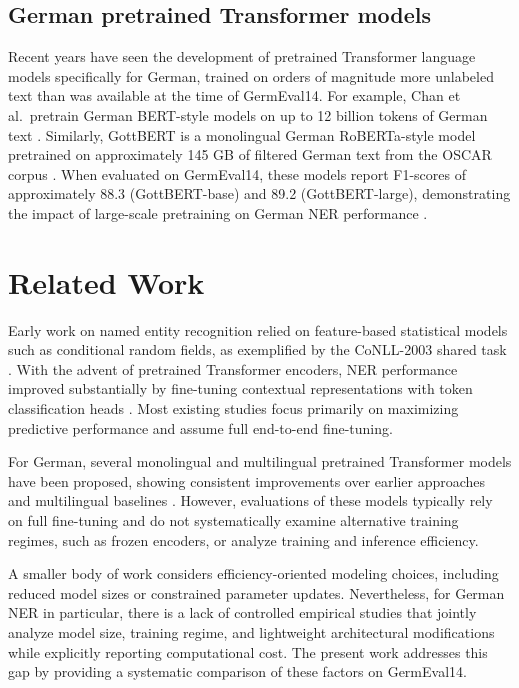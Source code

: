 \documentclass[11pt,a4paper,twocolumn]{article}
\begin{document}
\subsection{German pretrained Transformer models}
Recent years have seen the development of pretrained Transformer language models specifically for German, trained on orders of magnitude more unlabeled text than was available at the time of GermEval14.
For example, Chan et al.\ pretrain German BERT-style models on up to 12 billion tokens of German text \cite{chan_germans_2020}.
Similarly, GottBERT is a monolingual German RoBERTa-style model pretrained on approximately 145 GB of filtered German text from the OSCAR corpus \cite{scheible_gottbert_2024}.
When evaluated on GermEval14, these models report F1-scores of approximately 88.3 (GottBERT-base) and 89.2 (GottBERT-large), demonstrating the impact of large-scale pretraining on German NER performance \cite{scheible_gottbert_2024}.

\section{Related Work}

Early work on named entity recognition relied on feature-based statistical models such as conditional random fields, as exemplified by the CoNLL-2003 shared task \cite{tjong_kim_sang_introduction_2003}.
With the advent of pretrained Transformer encoders, NER performance improved substantially by fine-tuning contextual representations with token classification heads \cite{kaur_bert-ner_2024}.
Most existing studies focus primarily on maximizing predictive performance and assume full end-to-end fine-tuning.

For German, several monolingual and multilingual pretrained Transformer models have been proposed, showing consistent improvements over earlier approaches and multilingual baselines \cite{chan_germans_2020,scheible_gottbert_2024}.
However, evaluations of these models typically rely on full fine-tuning and do not systematically examine alternative training regimes, such as frozen encoders, or analyze training and inference efficiency.

A smaller body of work considers efficiency-oriented modeling choices, including reduced model sizes or constrained parameter updates.
Nevertheless, for German NER in particular, there is a lack of controlled empirical studies that jointly analyze model size, training regime, and lightweight architectural modifications while explicitly reporting computational cost.
The present work addresses this gap by providing a systematic comparison of these factors on GermEval14.
\end{document}
